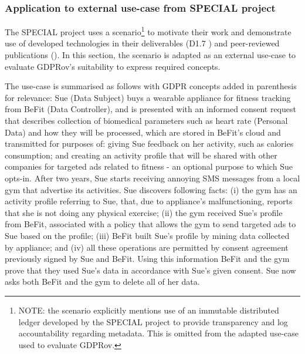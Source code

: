 \subsubsection{Application to external use-case from SPECIAL project}\label{sec:gdprov:use-case:SPECIAL}
The SPECIAL project uses a scenario\footnote{NOTE: the scenario explicitly mentions use of an immutable distributed ledger developed by the SPECIAL project to provide transparency and log accountability regarding metadata. This is omitted from the adapted use-case used to evaluate GDPRov.} to motivate their work and demonstrate use of developed technologies in their deliverables (D1.7 \cite{bonatti_d1.7_2018}) and peer-reviewed publications (\cite{kirrane_scalable_2018}).
In this section, the scenario is adapted as an external use-case to evaluate GDPRov's suitability to express required concepts.

The use-case is summarised as follows with GDPR concepts added in parenthesis for relevance: Sue (Data Subject) buys a wearable appliance for fitness tracking from BeFit (Data Controller), and is presented with an informed consent request that describes collection of biomedical parameters such as heart rate (Personal Data) and how they will be processed, which are stored in BeFit's cloud and transmitted for purposes of: giving Sue feedback on her activity, such as calories consumption; and creating an activity profile that will be shared with other companies for targeted ads related to fitness - an optional purpose to which Sue opts-in. After two years, Sue starts receiving annoying SMS messages from a local gym that advertise its activities. Sue discovers following facts: (i) the gym has an activity profile referring to Sue, that, due to appliance’s malfunctioning, reports that she is not doing any physical exercise; (ii) the gym received Sue's profile from BeFit, associated with a policy that allows the gym to send targeted ads to Sue based on the profile; (iii) BeFit built Sue's profile by mining data collected by appliance; and (iv) all these operations are permitted by consent agreement previously signed by Sue and BeFit. Using this information BeFit and the gym prove that they used Sue’s data in accordance with Sue's given consent. Sue now asks both BeFit and the gym to delete all of her data. 

